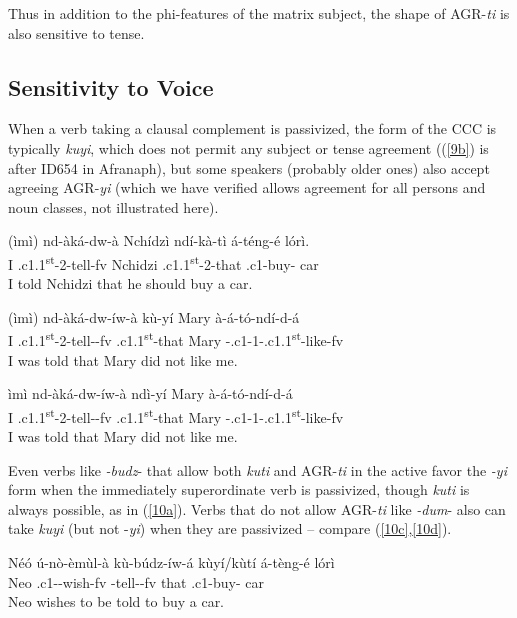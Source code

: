 \documentclass[output=paper,
modfonts
]{langscibook}
\begin{document}
Thus in addition to the phi-features of the matrix subject, the shape of AGR-\textit{ti} is also sensitive to tense.

\subsection{Sensitivity to Voice}

When a verb taking a clausal complement is passivized, the form of the CCC is typically \textit{kuyi}, which does not permit any subject or tense agreement ((\ref{9b}) is after ID654 in Afranaph), but some speakers (probably older ones) also accept agreeing AGR-\textit{yi} (which we have verified allows agreement for all persons and noun classes, not illustrated here).

\ea  
\ea \label{9a} \gll	(ìmì) nd-àká-dw-à Nchídzì ndí-kà-tì á-téng-é lórì.\\
	I .c1.1\textsuperscript{st}-2-tell-fv Nchidzi .c1.1\textsuperscript{st}-2-that .c1-buy-	car\\
	\glt I told Nchidzi that he should buy a car.

\ex \label{9b} \gll (ìmì) nd-àká-dw-íw-à   kù-yí     Mary à-á-tó-ndí-d-á\\
     	 I  .c1.1\textsuperscript{st}-2-tell--fv .c1.1\textsuperscript{st}-that Mary
         -.c1-1-.c1.1\textsuperscript{st}-like-fv\\
     \glt I was told that Mary did not like me.

\ex \label{9c} \gll ìmì nd-àká-dw-íw-à  ndì-yí Mary à-á-tó-ndí-d-á\\
         I .c1.1\textsuperscript{st}-2-tell--fv .c1.1\textsuperscript{st}-that Mary
         -.c1-1-.c1.1\textsuperscript{st}-like-fv\\
      	\glt I was told that Mary did not like me.	
\z \z

Even verbs like \textit{-budz}- that allow both \textit{kuti} and AGR-\textit{ti} in the active favor the \textit{-yi} form when the immediately superordinate verb is passivized, though \textit{kuti} is always possible, as in (\ref{10a}).  Verbs that do not allow AGR-\textit{ti} like \textit{-dum}- also can take \textit{kuyi} (but not -\textit{yi})  when they are passivized -- compare (\ref{10c},\ref{10d}).

\ea
\ea \label{10a} \gll Néó ú-nò-èmùl-à kù-búdz-íw-á kùyí/kùtí	á-tèng-é lórì\\
	Neo	.c1--wish-fv	-tell--fv	that	.c1-buy-	car\\
	\glt Neo wishes to be told to buy a car. 
\end{document}
